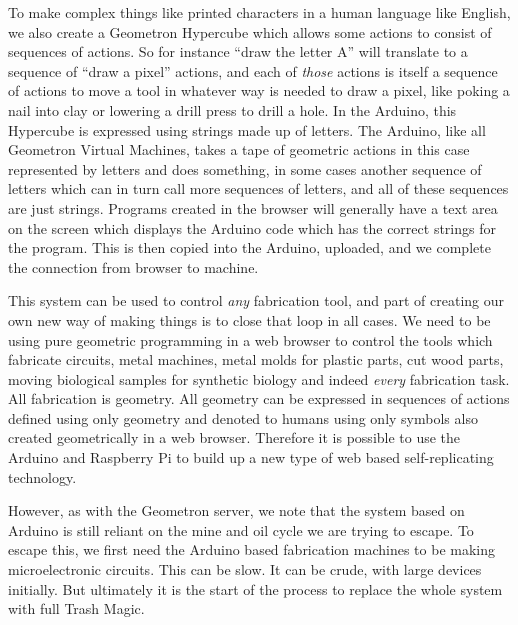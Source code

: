 To make complex things like printed characters in a human language like
English, we also create a Geometron Hypercube which allows some actions
to consist of sequences of actions. So for instance ``draw the letter
A'' will translate to a sequence of ``draw a pixel'' actions, and each
of \emph{those} actions is itself a sequence of actions to move a tool
in whatever way is needed to draw a pixel, like poking a nail into clay
or lowering a drill press to drill a hole. In the Arduino, this
Hypercube is expressed using strings made up of letters. The Arduino,
like all Geometron Virtual Machines, takes a tape of geometric actions
in this case represented by letters and does something, in some cases
another sequence of letters which can in turn call more sequences of
letters, and all of these sequences are just strings. Programs created
in the browser will generally have a text area on the screen which
displays the Arduino code which has the correct strings for the program.
This is then copied into the Arduino, uploaded, and we complete the
connection from browser to machine.

This system can be used to control \emph{any} fabrication tool, and part
of creating our own new way of making things is to close that loop in
all cases. We need to be using pure geometric programming in a web
browser to control the tools which fabricate circuits, metal machines,
metal molds for plastic parts, cut wood parts, moving biological samples
for synthetic biology and indeed \emph{every} fabrication task. All
fabrication is geometry. All geometry can be expressed in sequences of
actions defined using only geometry and denoted to humans using only
symbols also created geometrically in a web browser. Therefore it is
possible to use the Arduino and Raspberry Pi to build up a new type of
web based self-replicating technology.

However, as with the Geometron server, we note that the system based on
Arduino is still reliant on the mine and oil cycle we are trying to
escape. To escape this, we first need the Arduino based fabrication
machines to be making microelectronic circuits. This can be slow. It can
be crude, with large devices initially. But ultimately it is the start
of the process to replace the whole system with full Trash Magic.

